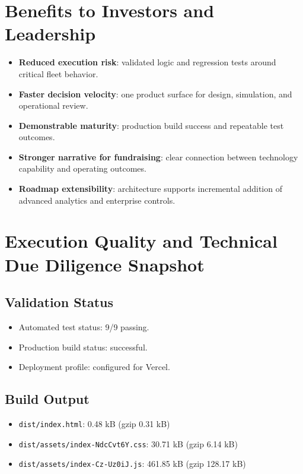 \documentclass[11pt,a4paper]{article}
\begin{document}
\section{Benefits to Investors and Leadership}
\begin{itemize}
  \item \textbf{Reduced execution risk}: validated logic and regression tests around critical fleet behavior.
  \item \textbf{Faster decision velocity}: one product surface for design, simulation, and operational review.
  \item \textbf{Demonstrable maturity}: production build success and repeatable test outcomes.
  \item \textbf{Stronger narrative for fundraising}: clear connection between technology capability and operating outcomes.
  \item \textbf{Roadmap extensibility}: architecture supports incremental addition of advanced analytics and enterprise controls.
\end{itemize}

\section{Execution Quality and Technical Due Diligence Snapshot}
\subsection*{Validation Status}
\begin{itemize}
  \item Automated test status: 9/9 passing.
  \item Production build status: successful.
  \item Deployment profile: configured for Vercel.
\end{itemize}

\subsection*{Build Output}
\begin{itemize}
  \item \texttt{dist/index.html}: 0.48 kB (gzip 0.31 kB)
  \item \texttt{dist/assets/index-NdcCvt6Y.css}: 30.71 kB (gzip 6.14 kB)
  \item \texttt{dist/assets/index-Cz-Uz0iJ.js}: 461.85 kB (gzip 128.17 kB)
\end{itemize}
\end{document}

